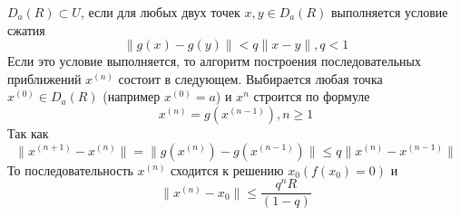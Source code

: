 $D_a(R) \subset U$, если для любых двух точек $x, y \in D_a(R)$ выполняется условие сжатия
\begin{equation} \label{eq:7.13}
	\|g(x) - g(y)\| < q\|x - y\|, q < 1
\end{equation}
Если это условие выполняется, то алгоритм построения последовательных приближений $x^{(n)}$ состоит в следующем. Выбирается любая точка $x^{(0)} \in D_a(R)$ (например $x^{(0)} = a$) и $x^{{n}}$ строится по формуле
\begin{equation} \label{eq:7.14}
	x^{(n)} = g(x^{(n-1)}), n \geq 1
\end{equation}
Так как
\begin{equation} \label{eq:7.15}
	\|x^{(n+1)} - x^{(n)}\| = \|g(x^{(n)}) - g(x^{(n-1)})\| \leq q\|x^{(n)} - x^{(n-1)}\|
\end{equation}
То последовательность $x^{(n)}$ сходится к решению $x_0 (f(x_0) = 0)$ и 
\begin{equation} \label{eq:7.16}
	\|x^{(n)} - x_0\| \leq \frac{q^nR}{(1-q)}
\end{equation}

